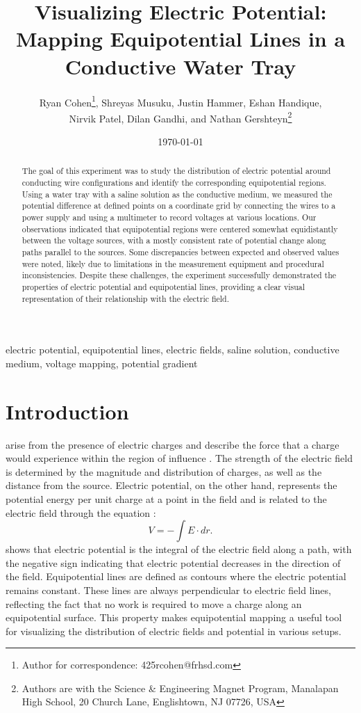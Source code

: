 \documentclass[10pt,journal,twoside]{IEEEtran}
\title{Visualizing Electric Potential: Mapping Equipotential Lines in a Conductive Water Tray}
\author{Ryan Cohen\thanks{Author for correspondence: 425rcohen@frhsd.com}, Shreyas Musuku, Justin Hammer, Eshan Handique,\\Nirvik Patel, Dilan Gandhi, and Nathan Gershteyn\thanks{Authors are with the Science \& Engineering Magnet Program, Manalapan High School, 20 Church Lane, Englishtown, NJ 07726, USA}}
\date{\today}
\newcommand{\keywords}{electric potential, equipotential lines, electric fields, saline solution, conductive medium, voltage mapping, potential gradient}
\begin{document}
\maketitle

\begin{abstract}
The goal of this experiment was to study the distribution of electric potential around conducting wire configurations and identify the corresponding equipotential regions. Using a water tray with a saline solution as the conductive medium, we measured the potential difference at defined points on a coordinate grid by connecting the wires to a power supply and using a multimeter to record voltages at various locations. Our observations indicated that equipotential regions were centered somewhat equidistantly between the voltage sources, with a mostly consistent rate of potential change along paths parallel to the sources. Some discrepancies between expected and observed values were noted, likely due to limitations in the measurement equipment and procedural inconsistencies. Despite these challenges, the experiment successfully demonstrated the properties of electric potential and equipotential lines, providing a clear visual representation of their relationship with the electric field.
\end{abstract}

\begin{IEEEkeywords}
\keywords
\end{IEEEkeywords}

\section{Introduction}
 arise from the presence of electric charges and describe the force that a charge would experience within the region of influence \cite{tipler, barrons, ling-2016-university}. The strength of the electric field is determined by the magnitude and distribution of charges, as well as the distance from the source. Electric potential, on the other hand, represents the potential energy per unit charge at a point in the field and is related to the electric field through the equation \cite{tipler}:
\begin{equation}
V = -\int E \cdot dr.
\label{eq:potential}
\end{equation}
 shows that electric potential is the integral of the electric field along a path, with the negative sign indicating that electric potential decreases in the direction of the field. Equipotential lines are defined as contours where the electric potential remains constant. These lines are always perpendicular to electric field lines, reflecting the fact that no work is required to move a charge along an equipotential surface. This property makes equipotential mapping a useful tool for visualizing the distribution of electric fields and potential in various setups.
\end{document}

